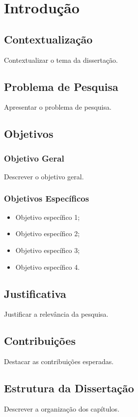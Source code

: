 \chapter{Introdução}

\section{Contextualização}
Contextualizar o tema da dissertação.

\section{Problema de Pesquisa}
Apresentar o problema de pesquisa.

\section{Objetivos}
\subsection{Objetivo Geral}
Descrever o objetivo geral.

\subsection{Objetivos Específicos}
\begin{itemize}
    \item Objetivo específico 1;
    \item Objetivo específico 2;
    \item Objetivo específico 3;
    \item Objetivo específico 4.
\end{itemize}

\section{Justificativa}
Justificar a relevância da pesquisa.

\section{Contribuições}
Destacar as contribuições esperadas.

\section{Estrutura da Dissertação}
Descrever a organização dos capítulos.
